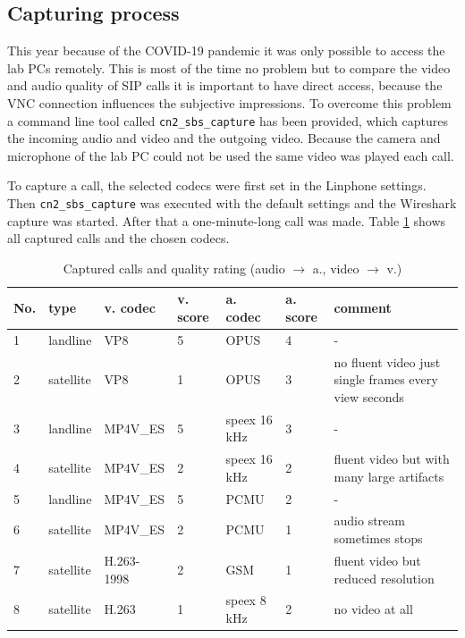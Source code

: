 \documentclass[parskip=full]{scrartcl}
\begin{document}
\subsection{Capturing process} \label{subsec:capture}
This year because of the COVID-19 pandemic it was only possible to access the lab PCs remotely.
This is most of the time no problem but to compare the video and audio quality of SIP calls it is important to have direct access, because the VNC connection influences the subjective impressions.
To overcome this problem a command line tool called \verb|cn2_sbs_capture| has been provided, which captures the incoming audio and video and the outgoing video.
Because the camera and microphone of the lab PC could not be used the same video was played each call.

To capture a call, the selected codecs were first set in the Linphone settings. 
Then \verb|cn2_sbs_capture| was executed with the default settings and the Wireshark capture was started. 
After that a one-minute-long call was made. 
Table \ref{tab:capture} shows all captured calls and the chosen codecs.

\begin{table}[hb]
	\centering
	\begin{tabular}{|l|l|l|l|l|l|p{}|}
		\hline
		\textbf{No.} & \textbf{type} & \textbf{v. codec} &\textbf{v. score} & \textbf{a. codec} & \textbf{a. score} & \textbf{comment} \\ 
		\hline
		1 & landline & VP8 &5& OPUS &4&- \\
		\hline
		2 & satellite & VP8 &1 &  OPUS &3&no fluent video just single frames every view seconds\\
		\hline
		3 & landline & MP4V\_ES &5& speex 16 kHz &3&-\\
		\hline
		4 & satellite & MP4V\_ES &2& speex 16 kHz &2& fluent video but with many large artifacts \\
		\hline
		5 & landline & MP4V\_ES &5& PCMU &2& -\\
		\hline
		6 & satellite & MP4V\_ES &2& PCMU &1& audio stream sometimes stops\\
		\hline
		7 & satellite & H.263-1998 &2& GSM&1& fluent video but reduced resolution\\
		\hline
		8 & satellite & H.263 &1& speex 8 kHz&2& no video at all\\
		\hline
	\end{tabular}
	\caption{Captured calls and quality rating (audio $\rightarrow$ a., video $\rightarrow$ v.)}
	\label{tab:capture}
\end{table}
\end{document}
